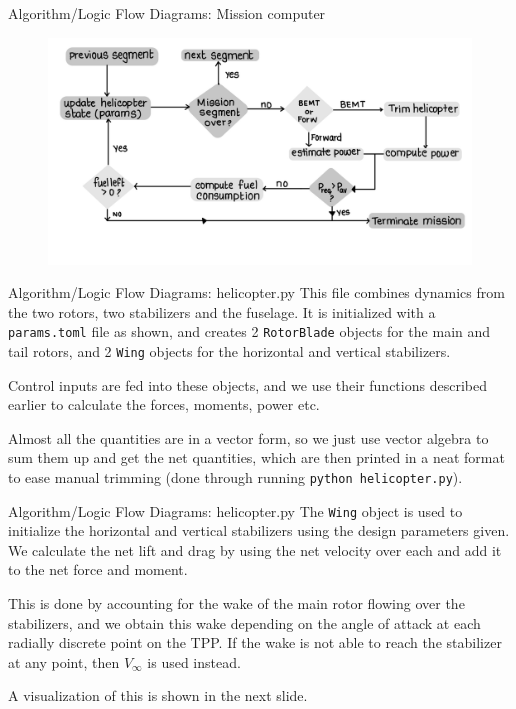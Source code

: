\documentclass{beamer}
\begin{document}
\begin{frame}{Algorithm/Logic Flow Diagrams: Mission computer}

  \begin{figure}
    \centering
    \includegraphics[width=\linewidth]{../images/mission_computer.jpeg}
  \end{figure}

\end{frame}

\begin{frame}{Algorithm/Logic Flow Diagrams: helicopter.py}
    This file combines dynamics from the two rotors, two stabilizers and the fuselage. It is initialized with a \texttt{params.toml} file as shown, and creates 2 \texttt{RotorBlade} objects for the main and tail rotors, and 2 \texttt{Wing} objects for the horizontal and vertical stabilizers.
    
    Control inputs are fed into these objects, and we use their functions described earlier to calculate the forces, moments, power etc.

    Almost all the quantities are in a vector form, so we just use vector algebra to sum them up and get the net quantities, which are then printed in a neat format to ease manual trimming (done through running \texttt{python helicopter.py}).
\end{frame}

\begin{frame}{Algorithm/Logic Flow Diagrams: helicopter.py}
    The \texttt{Wing} object is used to initialize the horizontal and vertical stabilizers using the design parameters given. We calculate the net lift and drag by using the net velocity over each and add it to the net force and moment.

    This is done by accounting for the wake of the main rotor flowing over the stabilizers, and we obtain this wake depending on the angle of attack at each radially discrete point on the TPP. If the wake is not able to reach the stabilizer at any point, then $V_{\infty}$ is used instead.

    A visualization of this is shown in the next slide.
\end{frame}
\end{document}
